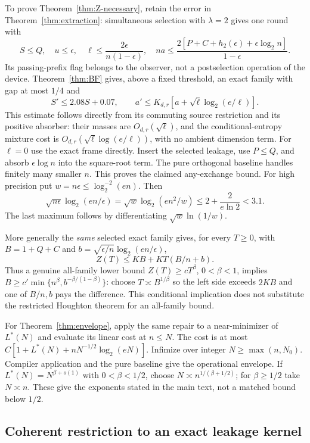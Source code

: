To prove Theorem~\ref{thm:Z-necessary}, retain the error in
Theorem~\ref{thm:extraction}: simultaneous selection with $\lambda=2$
gives one round with
\[
 S\leq Q,\quad u\leq\epsilon,\quad
 \ell\leq\frac{2\epsilon}{n(1-\epsilon)},\quad
 na\leq\frac{2[P+C+h_2(\epsilon)+\epsilon\log_2n]}{1-\epsilon}.
\]
Its passing-prefix flag belongs to the observer, not a postselection
operation of the device. Theorem~\ref{thm:BF} gives, above a fixed
threshold, an exact family with gap at most $1/4$ and
\[
 S'\leq2.08S+0.07,\qquad
 a'\leq K_{d,r}[a+\sqrt\ell\log_2(e/\ell)].
\]
This estimate follows directly from its commuting source restriction
and its positive absorber: their masses are $O_{d,r}(\sqrt\ell)$,
and the conditional-entropy mixture cost is
$O_{d,r}(\sqrt\ell\log(e/\ell))$, with no ambient dimension term.
For $\ell=0$ use the exact frame directly. Insert the selected leakage,
use $P\leq Q$, and absorb $\epsilon\log n$ into the square-root term.
The pure orthogonal baseline handles finitely many smaller $n$.
This proves the claimed any-exchange bound. For high precision put
$w=n\epsilon\leq\log_2^{-2}(en)$. Then
\[
 \sqrt{n\epsilon}\log_2(en/\epsilon)
 =\sqrt w\log_2(en^2/w)
 \leq2+\frac2{e\ln2}<3.1.
\]
The last maximum follows by differentiating $\sqrt w\ln(1/w)$.

More generally the \emph{same} selected exact family gives, for every
$T\geq0$, with $B=1+Q+C$ and
$b=\sqrt{\epsilon/n}\log_2(en/\epsilon)$,
\begin{equation}\label{eq:all-horizon-necessity}
 Z(T)\leq K B+KT(B/n+b).
\end{equation}
Thus a genuine all-family lower bound $Z(T)\geq cT^\beta$, $0<\beta<1$,
implies $B\geq c'\min\{n^\beta,b^{-\beta/(1-\beta)}\}$:
choose $T\asymp B^{1/\beta}$ so the left side exceeds $2KB$ and
one of $B/n,b$ pays the difference. This conditional implication does
not substitute the restricted Houghton theorem for an all-family bound.

For Theorem~\ref{thm:envelope}, apply the same repair to a near-minimizer
of $L^*(N)$ and evaluate its linear cost at $n\leq N$. The cost is
at most $C[1+L^*(N)+nN^{-1/2}\log_2(eN)]$. Infimize over integer
$N\geq\max(n,N_0)$. Compiler application and the pure baseline give
the operational envelope. If $L^*(N)=N^{\beta+o(1)}$ with
$0<\beta<1/2$, choose $N\asymp n^{1/(\beta+1/2)}$; for
$\beta\geq1/2$ take $N\asymp n$. These give the exponents stated
in the main text, not a matched bound below $1/2$.

\subsection{Coherent restriction to an exact leakage kernel}

